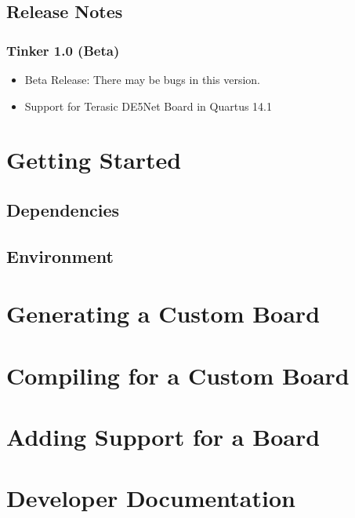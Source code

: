 \documentclass{refrep}
\begin{document}
\section{Release Notes}
\subsection{Tinker 1.0 (Beta)}
\begin{itemize}
  \item Beta Release: There may be bugs in this version. 
  \item Support for Terasic DE5Net Board in Quartus 14.1
\end{itemize}
\pagebreak
\chapter{Getting Started}
\label{Chapter:Tinker:Start}
\section{Dependencies}
\section{Environment}
\pagebreak
\chapter{Generating a Custom Board}
\label{Chapter:Tinker:Generating}
\pagebreak
\chapter{Compiling for a Custom Board}
\label{Chap:Tinker:Compiling}
\pagebreak
\chapter{Adding Support for a Board}
\label{Chap:Tinker:Adding}
\pagebreak
\chapter{Developer Documentation}
\label{Chap:Tinker:Adding}
\end{document}
